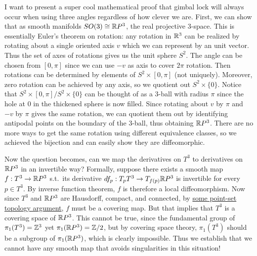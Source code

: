 \documentclass[12pt]{article}
\begin{document}
I want to present a super cool mathematical proof that gimbal lock will always occur when using three angles regardless of how clever we are. First, we can show that as smooth manifolds $ SO(3) \cong \mathbb{R} P^3$, the real projective 3-space. This is essentially Euler's theorem on rotation: any rotation in $ \mathbb{R}^3$ can be realized by rotating about a single oriented axis $ v$ which we can represent by an unit vector. Thus the set of axes of rotations gives us the unit sphere $ S^2$. The angle can be chosen from $ [0,\pi]$ since we can use $ -v$ as axis to cover  $ 2\pi$ rotation. Then rotations can be determined by elements of $ S^2 \times [0,\pi]$ (not uniquely). Moreover, zero rotation can be achieved by any axis, so we quotient out $ S^2\times \{0\}$. Notice that $ S^2 \times [0, \pi] / S^2 \times \{0\} $ can be thought of as a 3-ball with radius $ \pi$ since the hole at $ 0$ in the thickened sphere is now filled. Since rotating about $ v$ by $ \pi$ and $ -v$ by $\pi$ gives the same rotation, we can quotient them out by identifying antipodal points on the boundary of the 3-ball, thus obtaining $ \mathbb{R} P^3$. There are no more ways to get the same rotation using different equivalence classes, so we achieved the bijection and can easily show they are diffeomorphic.

Now the question becomes, can we map the derivatives on $ T^3$ to derivatives on $ \mathbb{R} P^3$ in an invertible way? Formally, suppose there exists a smooth map $f: T^3 \to \mathbb{R} P^3$ s.t.\ its derivative $ df_p: T_pT^3 \to T_{f(p)} \mathbb{R} P^3$ is invertible for every $ p \in T^3$. By inverse function theorem, $ f$ is therefore a local diffeomorphism. Now since  $ T^3$ and $ \mathbb{R} P^3$ are Hausdorff, compact, and connected, by \href{https://math.stackexchange.com/questions/45990/when-is-a-local-homeomorphism-a-covering-map?lq=1}{some point-set topology argument}, $ f$ must be a covering map. But that implies that $ T^3$ is a covering space of $ \mathbb{R} P^3$. This cannot be true, since the fundamental group of $ \pi_1(T^3) = \mathbb{Z}^3$ yet $ \pi_1(\mathbb{R} P^3) = \mathbb{Z} /2$, but by covering space theory, $ \pi_1(T^3)$ should be a subgroup of $ \pi_1( \mathbb{R} P^3)$, which is clearly impossible. Thus we establish that we cannot have any smooth map that avoids singularities in this situation!
\end{document}
